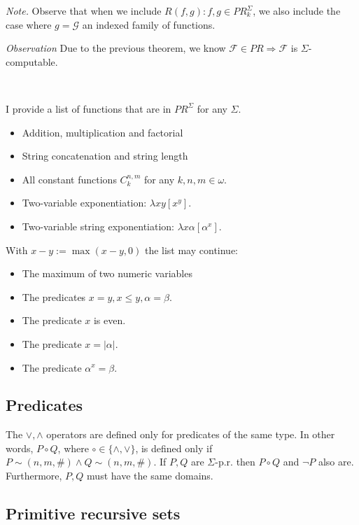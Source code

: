 \documentclass[a4paper, 12pt]{article}
\begin{document}
\textit{Note.} Observe that when we include $R(f, g) : f, g \in
PR_{k}^{\Sigma}$, we also include the case where $g = \mathcal{G}$ an indexed
family of functions.

\textit{Observation} Due to the previous theorem, we know $\mathcal{F} \in PR
\Rightarrow \mathcal{F} $ is $\Sigma$-computable.

~ 

I provide a list of functions that are in $PR^{\Sigma}$ for any $\Sigma$.


\begin{itemize}
    \item Addition, multiplication and factorial 
    \item String concatenation and string length  
    \item All constant functions $C_k^{n, m}$ for any $k, n, m \in \omega$.
    \item Two-variable exponentiation: $\lambda xy\left[ x^y \right] $. 
    \item Two-variable string exponentiation: $\lambda x\alpha\left[ \alpha^x
        \right] $.
\end{itemize}

With $x - y := \max(x - y, 0)$ the list may continue: 

\begin{itemize}
    \item The maximum of two numeric variables 
    \item The predicates $x = y, x \leq y, \alpha = \beta$.
    \item The predicate $x$ is even. 
    \item The predicate $x = |\alpha|$. 
    \item The predicate $\alpha^x = \beta$.
\end{itemize}

\subsection{Predicates}

The $\lor, \land$ operators are defined only for predicates of the same type. In
other words, $P \circ Q$, where $\circ \in \{\land, \lor\}$, is defined only if
$P \sim (n, m, \#) \land Q \sim (n, m, \#)$. If $P, Q$ are $\Sigma$-p.r. then $P
\circ Q$ and $\neg P$ also are. Furthermore, $P, Q$ must have the same domains.

\subsection{Primitive recursive sets}
\end{document}
